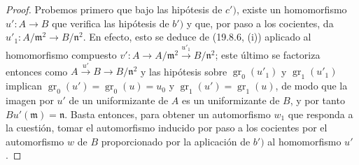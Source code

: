 \begin{proof}
Probemos primero que bajo las hipótesis de $c')$, existe un homomorfismo
$u':A\to B$ que verifica las hipótesis de $b')$ y que, por paso a los cocientes,
da $u'_1:A/\mathfrak m^2\to B/\mathfrak n^2$. En efecto, esto se deduce de
(19.8.6, (i)) aplicado al homomorfismo compuesto
$v':A\to A/\mathfrak m^2\xrightarrow{u'_1}B/\mathfrak n^2$;
este último se factoriza entonces como $A\xrightarrow{u'}B\to B/\mathfrak n^2$
y las hipótesis sobre $\operatorname{gr}_0(u'_1)$ y
$\operatorname{gr}_1(u'_1)$ implican
$\operatorname{gr}_0(u')=\operatorname{gr}_0(u)=u_0$ y
$\operatorname{gr}_1(u')=\operatorname{gr}_1(u)$, de modo que la imagen por
$u'$ de un uniformizante de $A$ es un uniformizante de $B$, y por tanto
$Bu'(\mathfrak m)=\mathfrak n$. Basta entonces, para obtener un automorfismo
$w_1$ que responda a la cuestión, tomar el automorfismo inducido por paso a los
cocientes por el automorfismo $w$ de $B$ proporcionado por la aplicación de
$b')$ al homomorfismo $u'$.
\end{proof}
